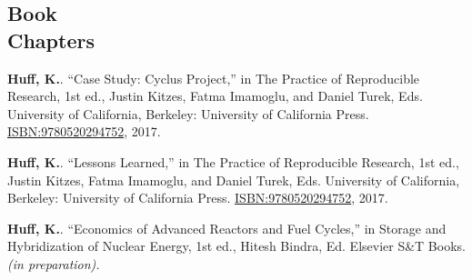 \documentclass[margin,line]{resume}
\begin{document}
\begin{resume}
    \section{\mysidestyle Book\\Chapters}
      \begin{bibenum} 
      \item \textbf{Huff, K.}. ``Case Study: Cyclus Project,'' in The Practice 
              of Reproducible Research, 1st ed., Justin Kitzes, Fatma Imamoglu, 
              and Daniel Turek, Eds. University of California, Berkeley: 
              University of California Press.  
              \href{https://www.ucpress.edu/book.php?isbn=9780520294752}{ISBN:9780520294752}, 2017.
      \item \textbf{Huff, K.}. ``Lessons Learned,'' in The Practice of Reproducible 
              Research, 1st ed., Justin Kitzes, Fatma Imamoglu, and Daniel 
              Turek, Eds. University of California, Berkeley: University of 
              California Press.  
              \href{https://www.ucpress.edu/book.php?isbn=9780520294752}{ISBN:9780520294752}, 2017.
      \item \textbf{Huff, K.}. ``Economics of Advanced Reactors and Fuel 
              Cycles,'' in Storage and Hybridization of Nuclear Energy, 1st 
              ed., Hitesh Bindra, Ed. Elsevier S\&T Books.\textsl{(in 
              preparation).}
      \end{bibenum}


\end{resume}
\end{document}
